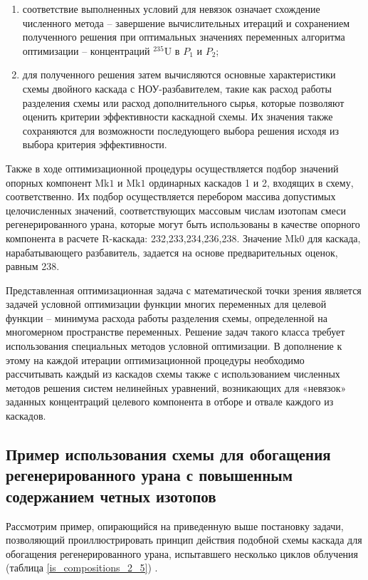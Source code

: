 \begin{enumerate}
    \item соответствие выполненных условий для невязок означает схождение численного метода -- завершение вычислительных итераций и сохранением полученного решения при оптимальных значениях переменных алгоритма оптимизации -- концентраций $^{235}$U в $P_1$ и $P_2$;
    \item для полученного решения затем вычисляются основные характеристики схемы двойного каскада с НОУ-разбавителем, такие как расход работы разделения схемы или расход дополнительного сырья, которые позволяют оценить критерии эффективности каскадной схемы. Их значения также сохраняются для возможности последующего выбора решения исходя из выбора критерия эффективности.
\end{enumerate}

Также в ходе оптимизационной процедуры осуществляется подбор значений опорных компонент $\text{Mk1}$ и $\text{Mk1}$ ординарных каскадов 1 и 2, входящих в схему, соответственно. Их подбор осуществляется перебором массива допустимых целочисленных значений, соответствующих массовым числам изотопам смеси регенерированного урана, которые могут быть использованы в качестве опорного компонента в расчете R-каскада: 232,233,234,236,238. Значение $\text{Mk0}$ для каскада, нарабатывающего разбавитель, задается на основе предварительных оценок, равным 238.

Представленная оптимизационная задача с математической точки зрения является задачей условной оптимизации функции многих переменных для целевой функции -- минимума расхода работы разделения схемы, определенной на многомерном пространстве переменных. Решение задач такого класса требует использования специальных методов условной оптимизации. В дополнение к этому на каждой итерации оптимизационной процедуры необходимо рассчитывать каждый из каскадов схемы также с использованием численных методов решения систем нелинейных уравнений, возникающих для «невязок» заданных концентраций целевого компонента в отборе и отвале каждого из каскадов.




\subsection{Пример использования схемы для обогащения регенерированного урана с повышенным содержанием четных изотопов}

Рассмотрим пример, опирающийся на приведенную выше постановку задачи, позволяющий проиллюстрировать принцип действия подобной схемы каскада для обогащения регенерированного урана, испытавшего несколько циклов облучения (таблица \ref*{is_compositions_2_5}) \cite{smirnovObogashchenieRegenerirovannogoUrana2018}. 


